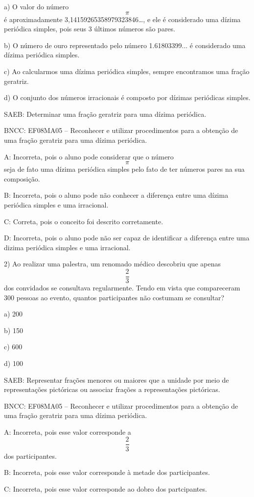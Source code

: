 a) O valor do número \[\pi\] é aproximadamente
3,14159265358979323846\ldots, e ele é considerado uma dízima periódica
simples, pois seus 3 últimos números são pares.

b) O número de ouro representado pelo número 1.61803399... é considerado
uma dízima periódica simples.

c) Ao calcularmos uma dízima periódica simples, sempre encontramos uma
fração geratriz.

d) O conjunto dos números irracionais é composto por dízimas periódicas
simples.

SAEB: Determinar uma fração geratriz para uma dízima periódica.

BNCC: EF08MA05 -- Reconhecer e utilizar procedimentos para a obtenção de
uma fração geratriz para uma dízima periódica.

A: Incorreta, pois o aluno pode considerar que o número \[\pi\] seja de
fato uma dízima periódica simples pelo fato de ter números pares na sua
composição.

B: Incorreta, pois o aluno pode não conhecer a diferença entre uma
dízima periódica simples e uma irracional.

C: Correta, pois o conceito foi descrito corretamente.

D: Incorreta, pois o aluno pode não ser capaz de identificar a diferença
entre uma dizima periódica simples e uma irracional.

2) Ao realizar uma palestra, um renomado médico descobriu que apenas
\[\frac{2}{3}\] dos convidados se consultava regularmente. Tendo em
vista que compareceram 300 pessoas ao evento, quantos participantes não
costumam se consultar?

a) 200

b) 150

c) 600

d) 100

SAEB: Representar frações menores ou maiores que a unidade por meio de
representações pictóricas ou associar frações a representações
pictóricas.

BNCC: EF08MA05 -- Reconhecer e utilizar procedimentos para a obtenção de
uma fração geratriz para uma dízima periódica.

A: Incorreta, pois esse valor corresponde a \[\frac {2}{3}\] dos
participantes.

B: Incorreta, pois esse valor corresponde à metade dos participantes.

C: Incorreta, pois esse valor corresponde ao dobro dos partcipantes.

